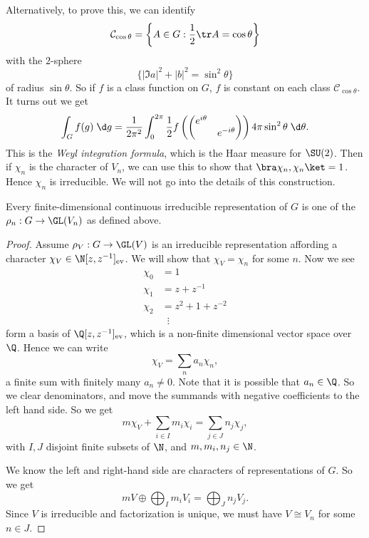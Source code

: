 \documentclass[a4paper]{article}
\begin{document}
Alternatively, to prove this, we can identify
\[
  \mathcal{C}_{\cos \theta} = \left\{A \in G: \frac{1}{2}\tr A = \cos \theta \right\}
\]
with the $2$-sphere
\[
  \{ |\Im a|^2 + |b|^2 = \sin^2 \theta\}
\]
of radius $\sin \theta$. So if $f$ is a class function on $G$, $f$ is constant on each class $\mathcal{C}_{\cos \theta}$. It turns out we get
\[
  \int_G f(g)\;\d g = \frac{1}{2\pi^2}\int_0^{2\pi} \frac{1}{2}f\left(
  \begin{pmatrix}
    e^{i\theta}\\
    &e^{-i\theta}
  \end{pmatrix}\right) 4\pi \sin^2 \theta\;\d \theta.
\]
This is the \emph{Weyl integration formula}, which is the Haar measure for $\SU(2)$. Then if $\chi_n$ is the character of $V_n$, we can use this to show that $\bra \chi_n, \chi_n\ket = 1$. Hence $\chi_n$ is irreducible. We will not go into the details of this construction.

\begin{thm}
  Every finite-dimensional continuous irreducible representation of $G$ is one of the $\rho_n: G \to \GL(V_n)$ as defined above.
\end{thm}

\begin{proof}
  Assume $\rho_V: G \to \GL(V)$ is an irreducible representation affording a character $\chi_V \in \N[z, z^{-1}]_{\mathrm{ev}}$. We will show that $\chi_V = \chi_n$ for some $n$. Now we see
  \begin{align*}
    \chi_0 &= 1\\
    \chi_1 &= z + z^{-1}\\
    \chi_2 &= z^2 +1 + z^{-2}\\
    &\;\;\vdots
  \end{align*}
  form a basis of $\Q[z, z^{-1}]_{\mathrm{ev}}$, which is a non-finite dimensional vector space over $\Q$. Hence we can write
  \[
    \chi_V = \sum_n a_n \chi_n,
  \]
  a finite sum with finitely many $a_n\not= 0$. Note that it is possible that $a_n \in \Q$. So we clear denominators, and move the summands with negative coefficients to the left hand side. So we get
  \[
    m \chi_V + \sum_{i \in I} m_i \chi_i = \sum_{j \in J} n_j \chi_j,
  \]
  with $I, J$ disjoint finite subsets of $\N$, and $m, m_i, n_j \in \N$.

  We know the left and right-hand side are characters of representations of $G$. So we get
  \[
    m V \oplus \bigoplus_I m_i V_i = \bigoplus_J n_j V_j.
  \]
  Since $V$ is irreducible and factorization is unique, we must have $V \cong V_n$ for some $n \in J$.
\end{proof}
\end{document}
